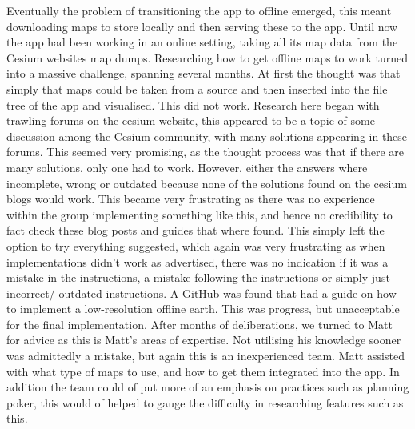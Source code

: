 \documentclass{l3proj}
\begin{document}
Eventually the problem of transitioning the app to offline emerged, this meant downloading maps to store locally and then serving these to the app.  Until now the app had been working in an online setting, taking all its map data from the Cesium websites map dumps.  Researching how to get offline maps to work turned into a massive challenge, spanning several months.  At first the thought was that simply that maps could be taken from a source and then inserted into the file tree of the app and visualised.  This did not work.  Research here began with trawling forums on the cesium website, this appeared to be a topic of some discussion among the Cesium community, with many solutions appearing in these forums\cite{OfflineMaps}.  This seemed very promising, as the thought process was that if there are many solutions, only one had to work.  However, either the answers where incomplete, wrong or outdated because none of the solutions found on the cesium blogs would work.  This became very frustrating as there was no experience within the group implementing something like this, and hence no credibility to fact check these blog posts and guides that where found.  This simply left the option to try everything suggested, which again was very frustrating as when implementations didn’t work as advertised, there was no indication if it was a mistake in the instructions, a mistake following the instructions or simply just incorrect/ outdated instructions.  A GitHub was found that had a guide on how to implement a low-resolution offline earth\cite{OfflineGuide}.  This was progress, but unacceptable for the final implementation.  After months of deliberations, we turned to Matt for advice as this is Matt’s areas of expertise. Not utilising his knowledge sooner was admittedly a mistake, but again this is an inexperienced team.  Matt assisted with what type of maps to use, and how to get them integrated into the app.  In addition the team could of put more of an emphasis on practices such as planning poker, this would of helped to gauge the difficulty in researching features such as this.  \par
\end{document}
